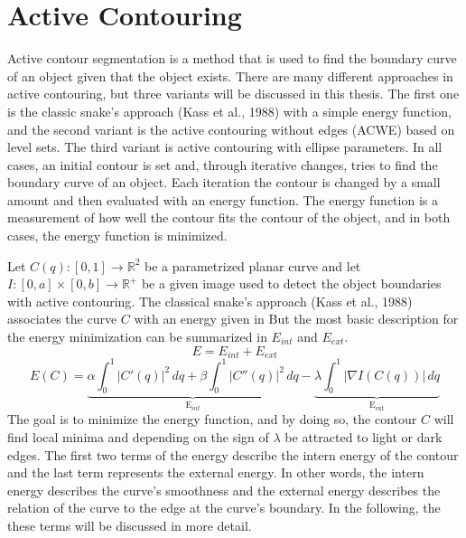 \section{Active Contouring }
Active contour segmentation \cite{vondracek_image_2018} is a method that is used to find the boundary curve of an object given that the object exists. There are many different approaches in active contouring, but three variants will be discussed in this thesis. The first one is the classic snake's approach (Kass et al., 1988) \cite{kass_snakes_1988} with a simple energy function, and the second variant is the active contouring without edges (ACWE)  based on level sets. The third variant is active contouring with ellipse parameters. In all cases, an initial contour is set and, through iterative changes, tries to find the boundary curve of an object. Each iteration the contour is changed by a small amount and then evaluated with an energy function. The energy function is a measurement of how well the contour fits the contour of the object, and in both cases, the energy function is minimized.

Let $C(q): [0, 1] \rightarrow \mathbb{R}^2$ be a parametrized planar curve and let $I : [0, a] \times [0, b] \rightarrow \mathbb{R}^+$ be a given image used to detect the object boundaries with active contouring. The classical snake's approach (Kass et al., 1988) \cite{kass_snakes_1988} associates the curve $C$ with an energy given in 
But the most basic description for the energy minimization can be summarized in $E_{int}$ and $E_{ext}$. 
\begin{equation}
    E = E_{int} + E_{ext}
    \label{energy}
\end{equation}
\begin{equation}
        E(C) = \underbrace{\alpha \int_0^1 |C'(q)|^2 \, dq + \beta \int_0^1 |C''(q)|^2 \, dq}_{\text{E}_{int}} - \underbrace{\lambda \int_0^1 |\nabla I (C(q))| \, dq}_{\text{E}_{\text{ext}}}
\label{acgd}
\end{equation}
The goal is to minimize the energy function, and by doing so, the contour $C$ will find local minima and depending on the sign of $\lambda$ be attracted to light or dark edges. The first two terms of the energy describe the intern energy of the contour and the last term represents the external energy. In other words, the intern energy describes the curve's smoothness and the external energy describes the relation of the curve to the edge at the curve's boundary. In the following, the these terms will be discussed in more detail.

